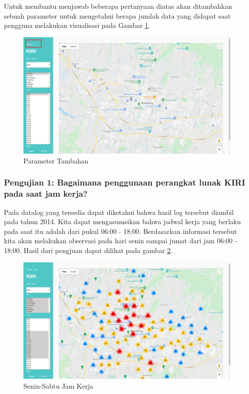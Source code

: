 Untuk membantu menjawab beberapa pertanyaan diatas akan ditambahkan sebuah parameter untuk mengetahui berapa jumlah data yang didapat saat pengguna melakukan visualisasi pada Gambar \ref{fig:testingState}.
   
    \begin{figure}[H]
	\centering  
	\includegraphics[scale=0.3]{Gambar/pengujian/result_helper.png}  
	\caption[parameter tambahan]{Parameter Tambahan} 
	\label{fig:testingState}
	\end{figure}
	

\subsubsection{Pengujian 1: Bagaimana penggunaan perangkat lunak KIRI pada saat jam kerja?}
\label{subsec:pengujian1}
Pada datalog yang tersedia dapat diketahui bahwa hasil log tersebut diambil pada tahun 2014. Kita dapat mengasumsikan bahwa jadwal kerja yang berlaku pada saat itu adalah dari pukul 06:00 - 18:00. Berdasarkan informasi tersebut kita akan melakukan observasi pada hari senin sampai jumat dari jam 06:00 - 18:00. Hasil dari pengjuan dapat dilihat pada gambar \ref{fig:operasional}.
  \begin{figure}[H]
	\centering  
	\includegraphics[scale=0.3]{Gambar/pengujian/senin-sabtu-operasional.png}  
	\caption[Senin-Sabtu Operasional]{Senin-Sabtu Jam Kerja} 
	\label{fig:operasional}
\end{figure}

